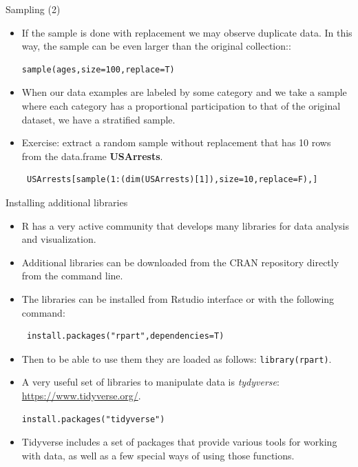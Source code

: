 \documentclass[handout]{beamer}
\begin{document}
\begin{frame}[fragile]{Sampling (2)}
\scriptsize{
\begin{itemize}
 \item If the sample is done with replacement we may observe duplicate data. In this way, the sample can be even larger than the original collection:: 

\begin{verbatim}
sample(ages,size=100,replace=T)
\end{verbatim}
 
 \item When our data examples are labeled by some category and we take a sample where each category has a proportional participation to that of the original dataset, we have a stratified sample.  
 
 \item Exercise: extract a random sample without replacement that has 10 rows from the data.frame \textbf{USArrests}. 
 
 \begin{verbatim}
 USArrests[sample(1:(dim(USArrests)[1]),size=10,replace=F),]
 \end{verbatim}

\end{itemize}



}
\end{frame}






\begin{frame}[fragile]{Installing additional libraries}
\scriptsize{
\begin{itemize}
 \item R has a very active community that develops many libraries for data analysis and visualization.
 \item Additional libraries can be downloaded from the CRAN repository directly from the command line.
 \item The libraries can be installed from Rstudio interface or with the following command:
 \begin{verbatim}
 install.packages("rpart",dependencies=T)
\end{verbatim} 

\item Then to be able to use them they are loaded as follows: \verb+library(rpart)+.

\item A very useful set of libraries to manipulate data is \textit{tydyverse}:  \url{https://www.tidyverse.org/}.

 \begin{verbatim}
install.packages("tidyverse")
\end{verbatim} 

\item Tidyverse includes a set of packages that provide various tools for working with data, as well as a few special ways of using those functions.

 
 \end{itemize}

 
}
 
\end{frame}
\end{document}
